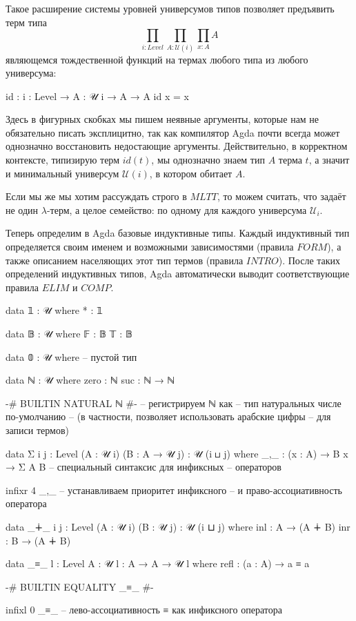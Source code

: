 \documentclass{article}[12pt]
\begin{document}
Такое расширение системы уровней универсумов типов позволяет предъявить терм типа
$$\prod_{i : Level} \prod_{A : \mathcal U(i)} \prod_{x : A} A$$
являющемся тождественной функций на термах любого типа из любого универсума:
\begin{code}
id : {i : Level} → {A : 𝒰 i} → A → A
id x = x
\end{code}
Здесь в фигурных скобках мы пишем неявные аргументы, которые нам не обязательно писать эксплицитно,
так как компилятор Agda почти всегда может однозначно восстановить недостающие аргументы. Действительно,
в корректном контексте, типизирую терм $id(t)$, мы однозначно знаем тип $A$ терма $t$, а значит и минимальный
универсум $\mathcal U(i)$, в котором обитает $A$.

Если мы же мы хотим рассуждать строго в $MLTT$, то можем считать, что  задаёт
не один $\lambda$-терм, а целое семейство: по одному для каждого универсума $\mathcal U_i$.

Теперь определим в Agda базовые индуктивные типы. Каждый индуктивный тип определяется
своим именем и возможными зависимостями (правила $FORM$), а также описанием населяющих
этот тип термов (правила $INTRO$). После таких определений индуктивных типов, Agda 
автоматически выводит соответствующие правила $ELIM$ и $COMP$.
\begin{code}
data 𝟙 : 𝒰 where
    * : 𝟙

data 𝔹 : 𝒰 where
    𝔽 : 𝔹
    𝕋 : 𝔹

data 𝟘 : 𝒰 where -- пустой тип

data ℕ : 𝒰 where
    zero : ℕ
    suc : ℕ → ℕ

{-# BUILTIN NATURAL ℕ #-} -- регистрируем ℕ как
-- тип натуральных числе по-умолчанию
-- (в частности, позволяет использовать арабские цифры
-- для записи термов)

data Σ {i j : Level} (A : 𝒰 i) (B : A → 𝒰 j) : 𝒰 (i ⊔ j) where
    _,_ : (x : A) → B x → Σ A B -- специальный синтаксис для инфиксных
-- операторов

infixr 4 _,_ -- устанавливаем приоритет инфиксного 
-- и право-ассоциативность оператора

data _∔_ {i j : Level} (A : 𝒰 i) (B : 𝒰 j) : 𝒰 (i ⊔ j) where
    inl : A → (A ∔ B)
    inr : B → (A ∔ B)

data _≡_ {l : Level} {A : 𝒰 l} : A → A → 𝒰 l where
    refl : (a : A) → a ≡ a

{-# BUILTIN EQUALITY _≡_  #-}

infixl 0 _≡_ -- лево-ассоциативность ≡ как инфиксного оператора
\end{code}
\end{document}
